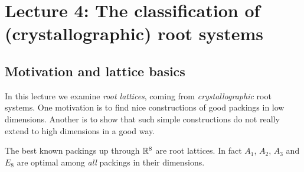 \newcommand{\LIVv}[1]{\filldraw[fill=white,draw=black] (#1) circle (0.09);}
\newcommand{\LIVe}[2]{\draw (#1) -- (#2);}
\newcommand{\LIVdR}[1]{\draw (#1,0.045) -- (#1+1,0.045); \draw (#1,-0.045) -- (#1+1,-0.045); \draw (#1+0.42,0.13) -- (#1+0.58,0) -- (#1+0.42,-0.13);}
\newcommand{\LIVdL}[1]{\draw (#1,0.045) -- (#1+1,0.045); \draw (#1,-0.045) -- (#1+1,-0.045); \draw (#1+0.58,0.13) -- (#1+0.42,0) -- (#1+0.58,-0.13);}
\newcommand{\LIVdN}[1]{\draw (#1,0.045) -- (#1+1,0.045); \draw (#1,-0.045) -- (#1+1,-0.045);}
\newcommand{\LIVtR}[1]{\draw (#1,0.07) -- (#1+1,0.07); \draw (#1,0) -- (#1+1,0); \draw (#1,-0.07) -- (#1+1,-0.07); \draw (#1+0.4,0.16) -- (#1+0.6,0) -- (#1+0.4,-0.16);}
\newcommand{\LIVtN}[1]{\draw (#1,0.07) -- (#1+1,0.07); \draw (#1,0) -- (#1+1,0); \draw (#1,-0.07) -- (#1+1,-0.07);}

\chapter[Lecture 4: Classification of root systems]{Lecture 4: The classification of (crystallographic) root systems}
\label{L04a:ch:L4}

\section{Motivation and lattice basics}
\label{L04a:sec:4.1}

In this lecture we examine \emph{root lattices}, coming from \emph{crystallographic} root systems.
One motivation is to find nice constructions of good packings in low dimensions. Another is to show
that such simple constructions do not really extend to high dimensions in a good way.

The best known packings up through $\mathbb{R}^8$ are root lattices. In fact $A_1$, $A_2$, $A_3$ and $E_8$ are
optimal among \emph{all} packings in their dimensions.

